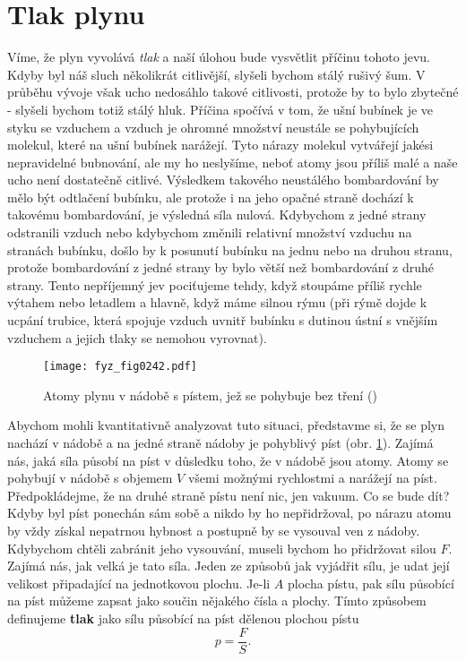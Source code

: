   \section{Tlak plynu}\label{fyz:IchapIXLsecII}
    Víme, že plyn vyvolává \emph{tlak} a naší úlohou bude vysvětlit příčinu tohoto jevu. Kdyby byl
    náš sluch několikrát citlivější, slyšeli bychom stálý rušivý šum. V průběhu vývoje však ucho
    nedosáhlo takové citlivosti, protože by to bylo zbytečné - slyšeli bychom totiž stálý hluk.
    Příčina spočívá v tom, že ušní bubínek je ve styku se vzduchem a vzduch je ohromné množství
    neustále se pohybujících molekul, které na ušní bubínek narážejí. Tyto nárazy molekul vytvářejí
    jakési nepravidelné bubnování, ale my ho neslyšíme, neboť atomy jsou příliš malé a naše ucho
    není dostatečně citlivé. Výsledkem takového neustálého bombardování by mělo být odtlačení
    bubínku, ale protože i na jeho opačné straně dochází k takovému bombardování, je výsledná síla
    nulová. Kdybychom z jedné strany odstranili vzduch nebo kdybychom změnili relativní množství
    vzduchu na stranách bubínku, došlo by k posunutí bubínku na jednu nebo na druhou stranu, protože
    bombardování z jedné strany by bylo větší než bombardování z druhé strany. Tento nepříjemný jev
    pociťujeme tehdy, když stoupáme příliš rychle výtahem nebo letadlem a hlavně, když máme silnou
    rýmu (při rýmě dojde k ucpání trubice, která spojuje vzduch uvnitř bubínku s dutinou ústní s
    vnějším vzduchem a jejich tlaky se nemohou vyrovnat).

    \begin{figure}[ht!] %
      \centering
      \texttt{[image: fyz\_fig0242.pdf]}
      \caption{Atomy plynu v nádobě s pístem, jež se pohybuje bez tření (\cite[s.~525]{Feynman01})}
      \label{fyz:fig0242}
    \end{figure}

    Abychom mohli kvantitativně analyzovat tuto situaci, představme si, že se plyn nachází v nádobě
    a na jedné straně nádoby je pohyblivý píst (obr. \ref{fyz:fig0242}). Zajímá nás, jaká síla působí
    na píst v důsledku toho, že v nádobě jsou atomy. Atomy se pohybují v nádobě s objemem \(V\)
    všemi možnými rychlostmi a narážejí na píst. Předpokládejme, že na druhé straně pístu není nic,
    jen vakuum. Co se bude dít? Kdyby byl píst ponechán sám sobě a nikdo by ho nepřidržoval, po
    nárazu atomu by vždy získal nepatrnou hybnost a postupně by se vysouval ven z nádoby. Kdybychom
    chtěli zabránit jeho vysouvání, museli bychom ho přidržovat silou \(F\). Zajímá nás, jak velká
    je tato síla. Jeden ze způsobů jak vyjádřit sílu, je udat její velikost připadající na
    jednotkovou plochu. Je-li \(A\) plocha pístu, pak sílu působící na píst můžeme zapsat jako
    součin nějakého čísla a plochy. Tímto způsobem definujeme \textbf{tlak} jako sílu působící na
    píst dělenou plochou pístu
    \begin{equation}\label{fyz:eq613}
      p = \frac{F}{S}.
    \end{equation}

